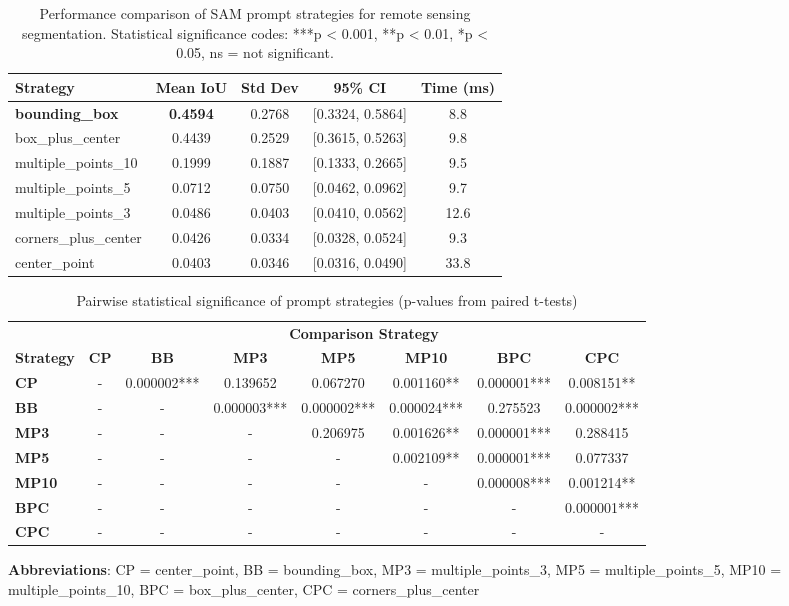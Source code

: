 \documentclass{article}
\begin{document}
\begin{table}[htbp]
\centering
\caption{Performance comparison of SAM prompt strategies for remote sensing segmentation. Statistical significance codes: ***p < 0.001, **p < 0.01, *p < 0.05, ns = not significant.}
\label{tab:results}
\begin{tabular}{@{}lcccc@{}}
\toprule
\textbf{Strategy} & \textbf{Mean IoU} & \textbf{Std Dev} & \textbf{95\% CI} & \textbf{Time (ms)} \\
\midrule
\textbf{bounding\_box} & \textbf{0.4594} & 0.2768 & [0.3324, 0.5864] & 8.8 \\
box\_plus\_center & 0.4439 & 0.2529 & [0.3615, 0.5263] & 9.8 \\
multiple\_points\_10 & 0.1999 & 0.1887 & [0.1333, 0.2665] & 9.5 \\
multiple\_points\_5 & 0.0712 & 0.0750 & [0.0462, 0.0962] & 9.7 \\
multiple\_points\_3 & 0.0486 & 0.0403 & [0.0410, 0.0562] & 12.6 \\
corners\_plus\_center & 0.0426 & 0.0334 & [0.0328, 0.0524] & 9.3 \\
center\_point & 0.0403 & 0.0346 & [0.0316, 0.0490] & 33.8 \\
\bottomrule
\end{tabular}
\end{table}

\begin{table}[htbp]
\centering
\caption{Pairwise statistical significance of prompt strategies (p-values from paired t-tests)}
\label{tab:significance}
\begin{tabular}{@{}lccccccc@{}}
\toprule
& \multicolumn{7}{c}{{\textbf{Comparison Strategy}}} \\
\cmidrule{2-8}
\textbf{Strategy} & \textbf{CP} & \textbf{BB} & \textbf{MP3} & \textbf{MP5} & \textbf{MP10} & \textbf{BPC} & \textbf{CPC} \\
\midrule
\textbf{CP} & - & 0.000002*** & 0.139652 & 0.067270 & 0.001160** & 0.000001*** & 0.008151** \\
\textbf{BB} & - & - & 0.000003*** & 0.000002*** & 0.000024*** & 0.275523 & 0.000002*** \\
\textbf{MP3} & - & - & - & 0.206975 & 0.001626** & 0.000001*** & 0.288415 \\
\textbf{MP5} & - & - & - & - & 0.002109** & 0.000001*** & 0.077337 \\
\textbf{MP10} & - & - & - & - & - & 0.000008*** & 0.001214** \\
\textbf{BPC} & - & - & - & - & - & - & 0.000001*** \\
\textbf{CPC} & - & - & - & - & - & - & - \\
\bottomrule
\end{tabular}
\smallskip
\footnotesize{\textbf{Abbreviations}: CP = center\_point, BB = bounding\_box, MP3 = multiple\_points\_3, MP5 = multiple\_points\_5, MP10 = multiple\_points\_10, BPC = box\_plus\_center, CPC = corners\_plus\_center}
\end{table}
\end{document}
